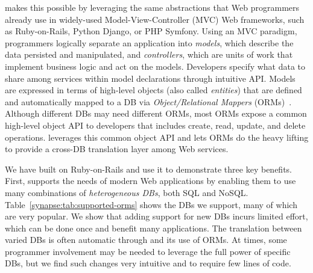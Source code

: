 \synapse makes this possible by leveraging the same abstractions
that Web programmers already use in widely-used Model-View-Controller
(MVC) Web frameworks, such as Ruby-on-Rails, Python Django, or PHP
Symfony.  Using an MVC paradigm, programmers logically separate an
application into \emph{models}, which describe the data persisted and
manipulated, and \emph{controllers}, which are units of work that
implement business logic and act on the models.
Developers specify what data to share among services within model declarations through \synapse intuitive API.
Models are expressed in
terms of high-level objects (also called \emph{entities}) that are
defined and automatically mapped to a DB via {\em Object/Relational
  Mappers} (ORMs)~\cite{Barcia:2008aa}.  Although different DBs
may need different ORMs, most ORMs expose a common high-level
object API to developers that includes create, read, update, and delete
operations.
\synapse 
leverages this common object API and lets ORMs do the heavy lifting to
provide a cross-DB translation layer among Web services.

\setlength{\tabcolsep}{2pt}
\begin{table}[t]
 \vspace{-9pt}
\caption{{{\bf DB types and vendors supported by \synapse.}}}
\vspace{-4pt}
\label{synapse:tab:supported-orms}
\end{table}
\setlength{\tabcolsep}{4pt}

We have built \synapse on Ruby-on-Rails and use it to demonstrate three
key benefits.  First, \synapse supports the needs of modern Web
applications by enabling them to use many combinations of
\emph{heterogeneous DBs}, both SQL and NoSQL. Table~\ref{synapse:tab:supported-orms}
shows the DBs we support, many of which are very popular.  We show that
adding support for new DBs incurs limited effort, which can be done once and
benefit many applications.  The translation between varied DBs is often
automatic through \synapse and its use of ORMs.  At times, some programmer
involvement may be needed to leverage the full power of specific DBs, but we
find such changes very intuitive and to require few lines of code.

